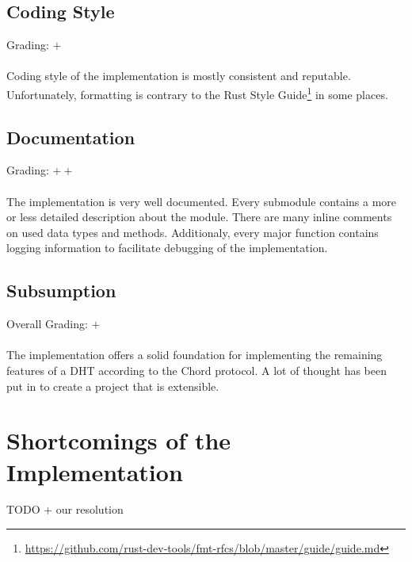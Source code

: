 \documentclass[a4paper, 11pt]{article}
\begin{document}
\subsection*{Coding Style}
Grading: $+$\\
\\
Coding style of the implementation is mostly consistent and reputable.
Unfortunately, formatting is contrary to the Rust Style Guide\footnote{\url{https://github.com/rust-dev-tools/fmt-rfcs/blob/master/guide/guide.md}} in some places.


\subsection*{Documentation}
Grading: $++$\\
\\
The implementation is very well documented.
Every submodule contains a more or less detailed description about the module.
There are many inline comments on used data types and methods.
Additionaly, every major function contains logging information to facilitate debugging of the implementation.


\subsection*{Subsumption}
Overall Grading: $+$\\
\\
The implementation offers a solid foundation for implementing the remaining features of a DHT according to the Chord protocol. 
A lot of thought has been put in to create a project that is extensible.

\section*{Shortcomings of the Implementation}
TODO + our resolution
\end{document}
